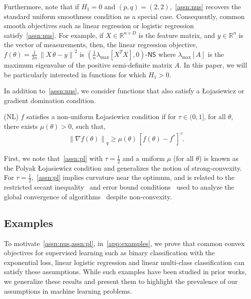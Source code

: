 \documentclass{article}
\newcommand{\normsq}[1]{\left\|#1 \right\|^{2}}
\newcommand{\norm}[1]{\left\|#1 \right\|}
\newcommand{\R}{\mathbb{R}}
\newcommand{\NS}{\textsf{NS}}
\begin{document}
Furthermore, note that if $H_1 = 0$ and $(p,q) = (2,2)$,~\cref{assn:nus} recovers the standard uniform smoothness condition as a special case. Consequently, common smooth objectives such as linear regression or logistic regression satisfy~\cref{assn:nus}. For example, if $X \in \R^{n \times D}$ is the feature matrix, and $y \in \R^n$ is the vector of measurements, then, the linear regression objective, $f(\theta) = \frac{1}{2n} \, \normsq{X \, \theta - y}$ is $(\frac{1}{n} \lambda_{\max}[X^T X], 0)$-$\NS$ where $\lambda_{\max} [A]$ is the maximum eigenvalue of the positive semi-definite matrix $A$. In this paper, we will be particularly interested in functions for which $H_1 > 0$. 

In addition to~\cref{assn:nus}, we consider functions that also satisfy a \L ojasiewicz or gradient domination condition. 
\begin{assumption}(\textsf{NL}) 
$f$ satisfies a non-uniform \L ojasiewicz condition if for $\tau \in (0,1]$, for all $\theta$, there exists $\mu(\theta) > 0$, such that, 
\begin{align}
\norm{\nabla f(\theta)}_{q} \geq \mu(\theta) \, [f(\theta) - f^*]^{\tau}.
\label{eq:pl}
\end{align}
\label{assn:pl}
\end{assumption}
\vspace{-4ex}
First, we note that~\cref{assn:pl} with $\tau = \frac{1}{2}$ and a uniform $\mu$ (for all $\theta$) is known as the Polyak \L ojasiewicz condition and generalizes the notion of strong-convexity. For $\tau = \frac{1}{2}$,~\cref{assn:pl} implies curvature near the optimum, and is related to the restricted secant inequality~\citep{zhang2013gradient} and error bound conditions~\citep{luo1993error} used to analyze the global convergence of algorithms~\citep{karimi2016linear} despite non-convexity.  

\subsection{Examples}
\label{sec:examples}
To motivate~\cref{assn:nus,assn:pl}, in~\cref{app:examples}, we prove that common convex objectives for supervised learning such as binary classification with the exponential loss, linear logistic regression and linear multi-class classification can satisfy these assumptions. While such examples have been studied in prior works, we generalize these results and present them to highlight the prevalence of our assumptions in machine learning problems. 
\end{document}

